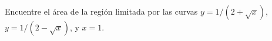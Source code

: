 \item Encuentre el área de la región limitada por las curvas $y = 1/(2 + \sqrt{x})$, $y = 1/(2 - \sqrt{x})$, y $x = 1$.
